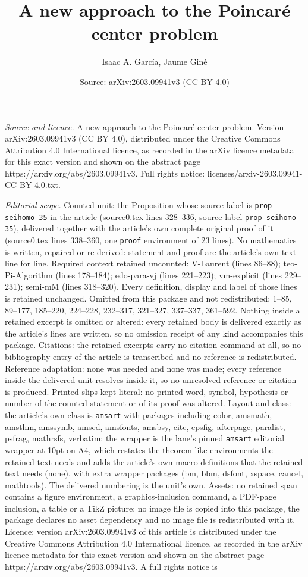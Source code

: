\documentclass[10pt,a4paper]{amsart}
\title[A new approach to the Poincar\'e center problem]{A new approach to the Poincar\'e center problem}
\author{Isaac A. Garc\'ia, Jaume Gin\'e}
\date{Source: arXiv:2603.09941v3 (CC BY 4.0)}
\begin{document}
\maketitle

\noindent\emph{Source and licence.} A new approach to the Poincar\'e center problem. Version arXiv:2603.09941v3 (CC BY 4.0), distributed under the Creative Commons Attribution 4.0 International licence, as recorded in the arXiv licence metadata for this exact version and shown on the abstract page https://arxiv.org/abs/2603.09941v3. Full rights notice: licenses/arxiv-2603.09941-CC-BY-4.0.txt.\par\smallskip

\noindent\textit{Editorial scope.} Counted unit: the Proposition whose source label is \texttt{prop-seihomo-35} in the article (source0.tex lines 328--336, source label \texttt{prop-seihomo-35}), delivered together with the article's own complete original proof of it (source0.tex lines 338--360, one \texttt{proof} environment of 23 lines). No mathematics is written, repaired or re-derived: statement and proof are the article's own text line for line. Required context retained uncounted: V-Laurent (lines 86--88); teo-Pi-Algorithm (lines 178--184); edo-para-vj (lines 221--223); vm-explicit (lines 229--231); semi-mM (lines 318--320). Every definition, display and label of those lines is retained unchanged. Omitted from this package and not redistributed: 1--85, 89--177, 185--220, 224--228, 232--317, 321--327, 337--337, 361--592. Nothing inside a retained excerpt is omitted or altered: every retained body is delivered exactly as the article's lines are written, so no omission receipt of any kind accompanies this package. Citations: the retained excerpts carry no citation command at all, so no bibliography entry of the article is transcribed and no reference is redistributed. Reference adaptation: none was needed and none was made; every reference inside the delivered unit resolves inside it, so no unresolved reference or citation is produced. Printed slips kept literal: no printed word, symbol, hypothesis or number of the counted statement or of its proof was altered. Layout and class: the article's own class is \texttt{amsart} with packages including color, amsmath, amsthm, amssymb, amscd, amsfonts, amsbsy, cite, epsfig, afterpage, paralist, psfrag, mathrsfs, verbatim; the wrapper is the lane's pinned \texttt{amsart} editorial wrapper at 10pt on A4, which restates the theorem-like environments the retained text needs and adds the article's own macro definitions that the retained text needs (none), with extra wrapper packages (bm, bbm, dsfont, xspace, cancel, mathtools). The delivered numbering is the unit's own. Assets: no retained span contains a figure environment, a graphics-inclusion command, a PDF-page inclusion, a table or a TikZ picture; no image file is copied into this package, the package declares no asset dependency and no image file is redistributed with it. Licence: version arXiv:2603.09941v3 of this article is distributed under the Creative Commons Attribution 4.0 International licence, as recorded in the arXiv licence metadata for this exact version and shown on the abstract page https://arxiv.org/abs/2603.09941v3. A full rights notice is 
\end{document}
